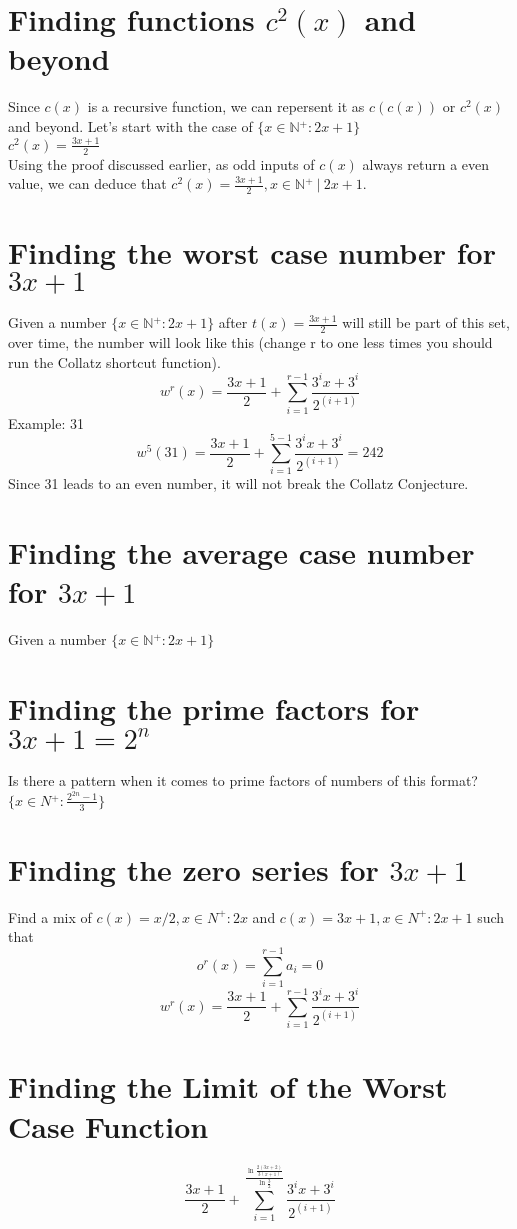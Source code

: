 \documentclass[a4paper,10pt]{article}
\begin{document}
  \section{Finding functions $c{^2}(x)$ and beyond}
  Since $c(x)$ is a recursive function, we can repersent it as $c(c(x))$ or $c{^2}(x)$ and beyond.
  Let's start with the case of \(\{x \in \mathbb{N{^+}} : 2x+1\}\) \\
  \(c^2(x) = \frac{3x+1}{2}\) \\
  Using the proof discussed earlier, as odd inputs of \(c(x)\) always return a even value, we can deduce that \(c^2(x) = \frac{3x+1}{2}, x \in \mathbb{N{^+}} \ | \ 2x+1\).
  \section{Finding the worst case number for $3x+1$}
  Given a number \(\{x \in \mathbb{N{^+}}: 2x + 1\}\) after \(t(x) = \frac{3x+1}{2}\) will still be part of this set, over time, the number will look like this (change r to one less times you should run the Collatz shortcut function).
  \[
    w^{r}(x) = \frac{3x+1}{2}+\sum_{i=1}^{r-1} \frac{3^{i}x+3^{i}}{2^{(i+1)}}
  \]
  Example: 31
  \[
     w^{5}(31) = \frac{3x+1}{2}+\sum_{i=1}^{5-1} \frac{3^{i}x+3^{i}}{2^{(i+1)}} = 242
  \]
  Since 31 leads to an even number, it will not break the Collatz Conjecture.
  \section{Finding the average case number for $3x+1$}
  Given a number \(\{x \in \mathbb{N{^+}}: 2x + 1\}\)
  \section{Finding the prime factors  for $3x+1=2^n$}
  Is there a pattern when it comes to prime factors of numbers of this format?
  \(\{x \in N{^+} : \frac{2^{2n}-1}{3}\}\)
  \section{Finding the zero series for $3x+1$}
  Find a mix of $c(x) = x/2, x \in N^{+} : 2x$ and $c(x) = 3x+1, x \in N^{+} : 2x + 1$ such that
  \[o^{r}(x) = \sum_{i=1}^{r-1} a_i = 0\]
  \[w^{r}(x) = \frac{3x+1}{2}+\sum_{i=1}^{r-1} \frac{3^{i}x+3^{i}}{2^{(i+1)}}\]
  \section{Finding the Limit of the Worst Case Function}
  \[
    \frac{3x+1}{2}+\sum_{i=1}^{\frac{\ln{\frac{2(3x+2)}{3(x+1)}}}{\ln{\frac{3}{2}}}} \frac{3^{i}x+3^{i}}{2^{(i+1)}}
  \]
\end{document}
